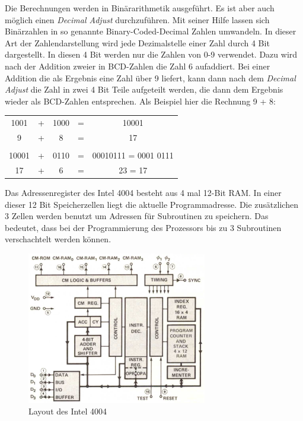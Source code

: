 Die Berechnungen werden in Binärarithmetik ausgeführt. Es ist aber auch möglich einen \textit{Decimal Adjust} durchzuführen. Mit seiner Hilfe lassen sich Binärzahlen in so genannte Binary-Coded-Decimal Zahlen umwandeln. In dieser Art der Zahlendarstellung wird jede Dezimalstelle einer Zahl durch 4 Bit dargestellt. In diesen 4 Bit werden nur die Zahlen von 0-9 verwendet. Dazu wird nach der Addition zweier in BCD-Zahlen die Zahl 6 aufaddiert. Bei einer Addition die als Ergebnis eine Zahl über 9 liefert, kann dann nach dem \textit{Decimal Adjust} die Zahl in zwei 4 Bit Teile aufgeteilt werden, die dann dem Ergebnis wieder als BCD-Zahlen entsprechen. Als Beispiel hier die Rechnung 9 + 8:
\begin{table}[H]
	\centering
	\begin{tabular}{c c c c c}
		1001 & + & 1000 & = & 10001 \\
		9 & + & 8  & = & 17 \\
		& & & & \\
		10001 & + & 0110 & = & 00010111 = 0001 0111 \\
		17 & + & 6 & = & 23 = 17
	\end{tabular}
\end{table}

Das Adressenregister des Intel 4004 besteht aus 4 mal 12-Bit RAM. In einer dieser 12 Bit Speicherzellen liegt die aktuelle Programmadresse. Die zusätzlichen 3 Zellen werden benutzt um Adressen für Subroutinen zu speichern. Das bedeutet, dass bei der Programmierung des Prozessors bis zu 3 Subroutinen verschachtelt werden können.
 \begin{figure}[h]
 	\centering
 	\includegraphics[width=0.7\textwidth]{figures/layout_4004.png}
 	\caption{Layout des Intel 4004}
 	\label{fig:layout_4004}
 \end{figure}
 

